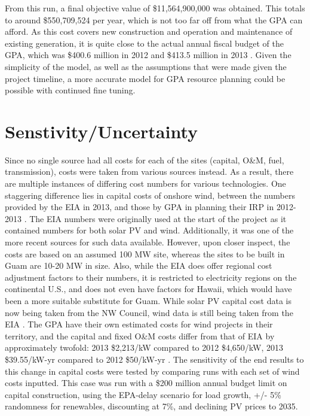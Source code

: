 \documentclass[12pt,letterpaper,fleqn]{article}
\begin{document}
From this run, a final objective value of \$11,564,900,000 was
obtained. This totals to around \$550,709,524 per year, which is not
too far off from what the GPA can afford. As this cost covers new
construction and operation and maintenance of existing generation, it
is quite close to the actual annual fiscal budget of the GPA, which
was \$400.6 million in 2012 and \$413.5 million in 2013
\cite{cruz13}. Given the simplicity of the model, as well as the
assumptions that were made given the project timeline, a more accurate
model for GPA resource planning could be possible with continued fine
tuning.

\section{Senstivity/Uncertainty}

Since no single source had all costs for each of the sites (capital,
O\&M, fuel, transmission), costs were taken from various sources
instead. As a result, there are multiple instances of differing cost
numbers for various technologies. One staggering difference lies in
capital costs of onshore wind, between the numbers provided by the EIA
in 2013, and those by GPA in planning their IRP in 2012-2013
\cite{eia13, cruz13}. The EIA numbers were originally used at the
start of the project as it contained numbers for both solar PV and
wind. Additionally, it was one of the more recent sources for such
data available. However, upon closer inspect, the costs are based on
an assumed 100 MW site, whereas the sites to be built in Guam are
10-20 MW in size. Also, while the EIA does offer regional cost
adjustment factors to their numbers, it is restricted to electricity
regions on the continental U.S., and does not even have factors for
Hawaii, which would have been a more suitable substitute for
Guam. While solar PV capital cost data is now being taken from the NW
Council, wind data is still being taken from the EIA
\cite{simmons13}. The GPA have their own estimated costs for wind
projects in their territory, and the capital and fixed O\&M costs
differ from that of EIA by approximately twofold: 2013 \$2,213/kW
compared to 2012 \$4,650/kW, 2013 \$39.55/kW-yr compared to 2012
\$50/kW-yr \cite{eia13, cruz13}. The sensitivity of the end results to
this change in capital costs were tested by comparing runs with each
set of wind costs inputted. This case was run with a \$200 million
annual budget limit on capital construction, using the EPA-delay
scenario for load growth, +/- 5\% randomness for renewables,
discounting at 7\%, and declining PV prices to 2035.
\end{document}

